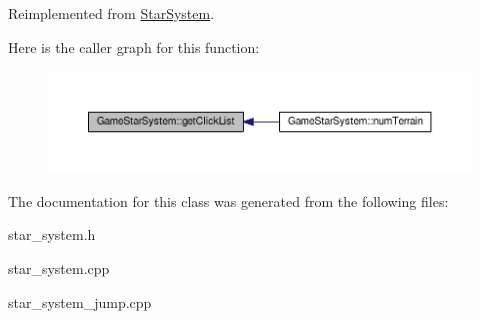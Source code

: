 Reimplemented from \hyperlink{classStarSystem}{Star\+System}.



Here is the caller graph for this function\+:
\nopagebreak
\begin{figure}[H]
\begin{center}
\leavevmode
\includegraphics[width=350pt]{d5/d38/classGameStarSystem_a88b2c8285b7f190a727586025ffddb94_icgraph}
\end{center}
\end{figure}




The documentation for this class was generated from the following files\+:\begin{DoxyCompactItemize}
\item 
star\+\_\+system.\+h\item 
star\+\_\+system.\+cpp\item 
star\+\_\+system\+\_\+jump.\+cpp\end{DoxyCompactItemize}
